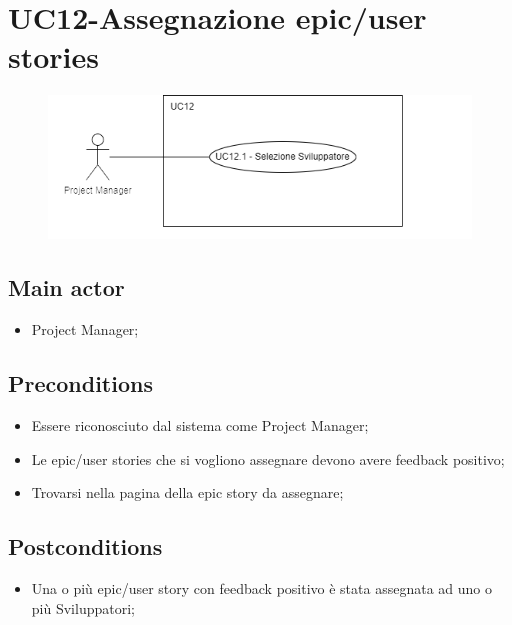 \documentclass{article}
\begin{document}
\section{UC12-Assegnazione epic/user stories}
    \begin{figure}[h]
      \centering
      \includegraphics{./imgUML/UC12.png}
      \label{fig:immagine}
    \end{figure}

    \subsection*{Main actor}
    \begin{itemize}
        \item Project Manager;
    \end{itemize}
    
    \subsection*{Preconditions}
        \begin{itemize}
            \item Essere riconosciuto dal sistema come Project Manager;
            \item Le epic/user stories che si vogliono assegnare devono avere feedback positivo;
            \item Trovarsi nella pagina della epic story da assegnare;
        \end{itemize}
        
    \subsection*{Postconditions}
        \begin{itemize}
            \item Una o più epic/user story con feedback positivo è stata assegnata ad uno o più Sviluppatori;
        \end{itemize}
    
\end{document}
